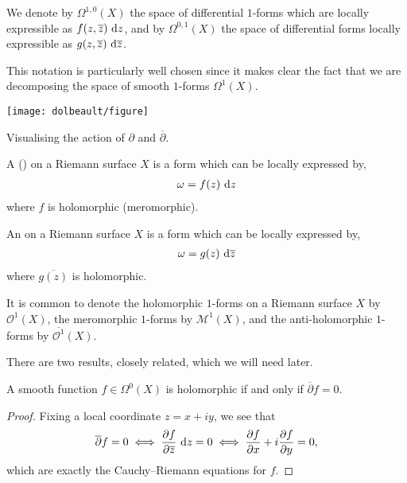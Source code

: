 \begin{notation}
	We denote by $ \Omega ^{1,0}(X) $ the space of differential $ 1 $-forms which
	are locally expressible as $ f(z,\overline{z})\operatorname{\, d\!}{z} $, and by $ \Omega
		^{0,1}(X) $ the space of differential forms locally expressible as $ g(z,
		\overline{z})\operatorname{\, d\!}{\overline{z}} $.

	This notation is particularly well chosen since it makes clear the fact that
	we are decomposing the space of smooth $ 1 $-forms $ \Omega^1(X) $.
\end{notation}

\begin{marginfigure}
	\centering
	\texttt{[image: dolbeault/figure]}
	\caption{Visualising the action of $ \partial $ and $ \overline{\partial} $.}
\end{marginfigure}

\begin{definition}
	A  () on a
	Riemann surface $ X $ is a form which can be locally expressed by,
	\begin{align*}
		\omega = f(z) \operatorname{\, d\!}{z}
	\end{align*}
	where $ f $ is holomorphic (meromorphic).
\end{definition}

\begin{definition}
	An  on a Riemann surface $ X $ is a form
	which can be locally expressed by,
	\begin{align*}
		\omega = g(z) \operatorname{\, d\!}{\overline{z}}
	\end{align*}
	where $ \overline{g(z)} $ is holomorphic.
\end{definition}

\begin{notation}
	It is common to denote the holomorphic $ 1 $-forms on a Riemann surface $ X $
	by $ \mathcal{O}^{1}(X) $, the meromorphic $ 1 $-forms by $
		\mathcal{M}^{1}(X) $, and the anti-holomorphic $ 1 $-forms by $
		\overline{\mathcal{O}^{1}}(X) $.
\end{notation}

There are two results, closely related, which we will need later.

\begin{proposition}\label{prop:hol}
	A smooth function $ f \in \Omega^0(X) $ is holomorphic if and only if $
		\overline{\partial }f=0 $.
	\begin{proof}
		Fixing a local coordinate $ z=x+iy $, we see that
		\begin{align*}
			\overline{\partial }f = 0 \iff
			\frac{\partial f}{\partial \overline{z}} \operatorname{\, d\!}{z}=0 \iff
			\frac{\partial f}{\partial x}+i \frac{\partial f}{\partial y}=0,
		\end{align*}
		which are exactly the Cauchy--Riemann equations for $ f $.
	\end{proof}
\end{proposition}

